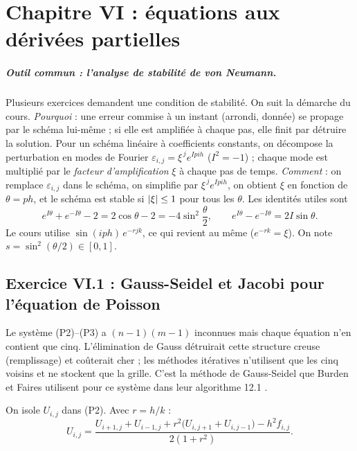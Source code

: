 \chapter{Chapitre VI : équations aux dérivées partielles}

\paragraph{Outil commun : l'analyse de stabilité de von Neumann.}
Plusieurs exercices demandent une condition de stabilité. On suit la démarche
du cours. \emph{Pourquoi} : une erreur commise à un instant (arrondi, donnée)
se propage par le schéma lui-même ; si elle est amplifiée à chaque pas, elle
finit par détruire la solution. Pour un schéma linéaire à coefficients
constants, on décompose la perturbation en modes de Fourier
$\varepsilon_{i,j} = \xi^{\,j}e^{Ipih}$ ($I^2 = -1$) ; chaque mode est
multiplié par le \emph{facteur d'amplification} $\xi$ à chaque pas de temps.
\emph{Comment} : on remplace $\varepsilon_{i,j}$ dans le schéma, on simplifie
par $\xi^{\,j}e^{Ipih}$, on obtient $\xi$ en fonction de $\theta = ph$, et le
schéma est stable si $\left|\xi\right| \le 1$ pour tous les $\theta$. Les identités
utiles sont
\[
  e^{I\theta} + e^{-I\theta} - 2 = 2\cos\theta - 2 = -4\sin^2\frac{\theta}{2},
  \qquad e^{I\theta} - e^{-I\theta} = 2I\sin\theta .
\]
Le cours utilise $\sin(iph)\,e^{-rjk}$, ce qui revient au même ($e^{-rk} = \xi$).
On note $s = \sin^2(\theta/2) \in [0,1]$.

\section{Exercice VI.1 : Gauss-Seidel et Jacobi pour l'équation de Poisson}


\Pourquoi Le système (P2)--(P3) a $(n-1)(m-1)$ inconnues mais chaque équation
n'en contient que cinq. L'élimination de Gauss détruirait cette structure
creuse (remplissage) et coûterait cher ; les méthodes itératives n'utilisent
que les cinq voisins et ne stockent que la grille. C'est la méthode de
Gauss-Seidel que Burden et Faires utilisent pour ce système dans leur
algorithme 12.1 .

\Etapes
{} On isole $U_{i,j}$ dans (P2). Avec $r = h/k$ :
\[
  U_{i,j} = \frac{U_{i+1,j} + U_{i-1,j} + r^2\bigl(U_{i,j+1} + U_{i,j-1}\bigr) - h^2f_{i,j}}{2(1 + r^2)} .
\]

